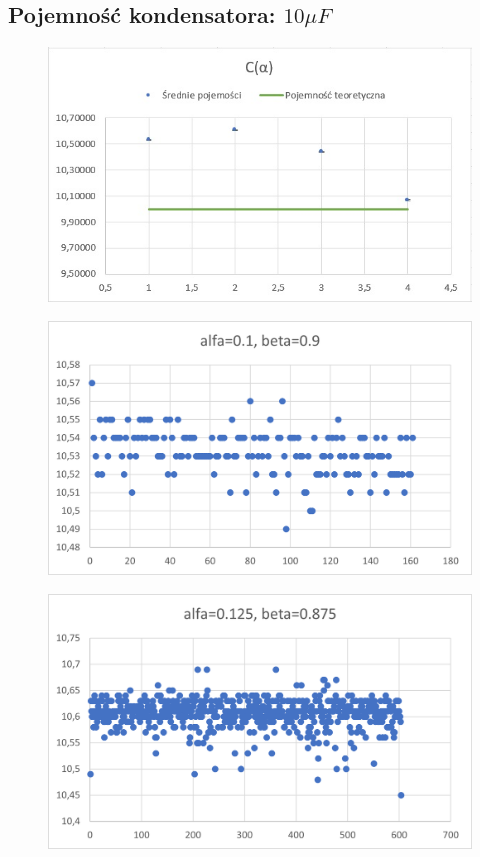 \documentclass[12pt]{mwart}
\begin{document}
	\subsection{Pojemność kondensatora: $10 \mu F$}
	\begin{figure}[H]
		\centering
		\includegraphics{10_sr.jpg}
	\end{figure}
	\begin{figure}[H]
		\centering
		\includegraphics{10_a0.1.png}
	\end{figure}
	\begin{figure}[H]
		\centering
		\includegraphics{10_a0.125.png}
	\end{figure}
\end{document}
